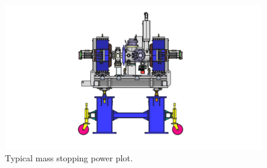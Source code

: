 \begin{figure}[ht]
	\includegraphics[width=\textwidth]{03_Prototype/figures/fig007_LWU.jpeg}
	\caption[Typical mass stopping power plot]{Typical mass stopping power plot.}
	\label{chap3:maxwell_gas_log1}
\end{figure}
